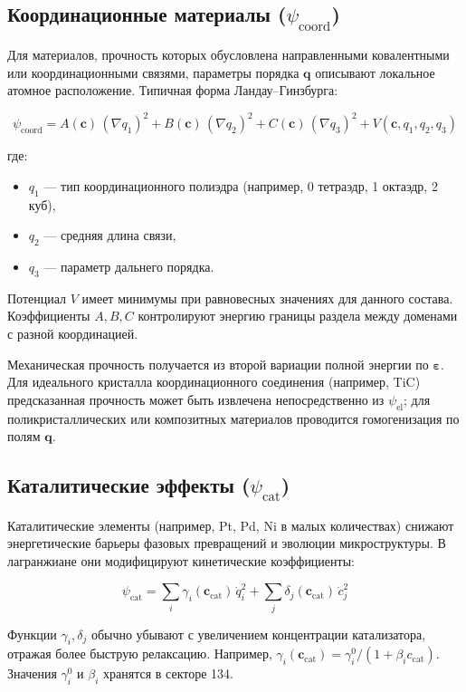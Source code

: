 \documentclass[12pt,a4paper]{article}
\begin{document}
	\subsection{Координационные материалы (\(\psi_{\mathrm{coord}}\))}
	\label{subsec:coordination}
	
	Для материалов, прочность которых обусловлена направленными ковалентными или координационными связями, параметры порядка \(\mathbf{q}\) описывают локальное атомное расположение. Типичная форма Ландау–Гинзбурга:
	
	\[
	\psi_{\mathrm{coord}} = A(\mathbf{c})\,(\nabla q_1)^2 + B(\mathbf{c})\,(\nabla q_2)^2 + C(\mathbf{c})\,(\nabla q_3)^2 + V(\mathbf{c}, q_1, q_2, q_3)
	\]
	
	где:
	\begin{itemize}
		\item \(q_1\) — тип координационного полиэдра (например, 0 тетраэдр, 1 октаэдр, 2 куб),
		\item \(q_2\) — средняя длина связи,
		\item \(q_3\) — параметр дальнего порядка.
	\end{itemize}
	
	Потенциал \(V\) имеет минимумы при равновесных значениях для данного состава. Коэффициенты \(A,B,C\) контролируют энергию границы раздела между доменами с разной координацией.
	
	Механическая прочность получается из второй вариации полной энергии по \(\boldsymbol{\varepsilon}\). Для идеального кристалла координационного соединения (например, TiC) предсказанная прочность может быть извлечена непосредственно из \(\psi_{\mathrm{el}}\); для поликристаллических или композитных материалов проводится гомогенизация по полям \(\mathbf{q}\).
	
	\subsection{Каталитические эффекты (\(\psi_{\mathrm{cat}}\))}
	\label{subsec:catalysis}
	
	Каталитические элементы (например, Pt, Pd, Ni в малых количествах) снижают энергетические барьеры фазовых превращений и эволюции микроструктуры. В лагранжиане они модифицируют кинетические коэффициенты:
	
	\[
	\psi_{\mathrm{cat}} = \sum_i \gamma_i(\mathbf{c}_{\mathrm{cat}})\, \dot{q}_i^2 + \sum_j \delta_j(\mathbf{c}_{\mathrm{cat}})\, \dot{c}_j^2
	\]
	
	Функции \(\gamma_i, \delta_j\) обычно убывают с увеличением концентрации катализатора, отражая более быструю релаксацию. Например, \(\gamma_i(\mathbf{c}_{\mathrm{cat}}) = \gamma_i^0 / (1 + \beta_i c_{\mathrm{cat}})\). Значения \(\gamma_i^0\) и \(\beta_i\) хранятся в секторе 134.
	
\end{document}
